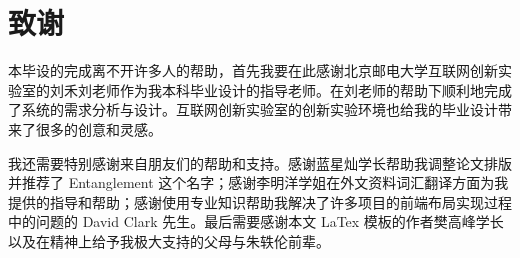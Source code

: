 \chapter*{致\qquad 谢}
\songti{}

本毕设的完成离不开许多人的帮助，首先我要在此感谢北京邮电大学互联网创新实验室的刘禾刘老师作为我本科毕业设计的指导老师。在刘老师的帮助下顺利地完成了系统的需求分析与设计。互联网创新实验室的创新实验环境也给我的毕业设计带来了很多的创意和灵感。

我还需要特别感谢来自朋友们的帮助和支持。感谢蓝星灿学长帮助我调整论文排版并推荐了 Entanglement 这个名字；感谢李明洋学姐在外文资料词汇翻译方面为我提供的指导和帮助；感谢使用专业知识帮助我解决了许多项目的前端布局实现过程中的问题的 David Clark 先生。最后需要感谢本文 LaTex 模板的作者樊高峰学长以及在精神上给予我极大支持的父母与朱轶伦前辈。

